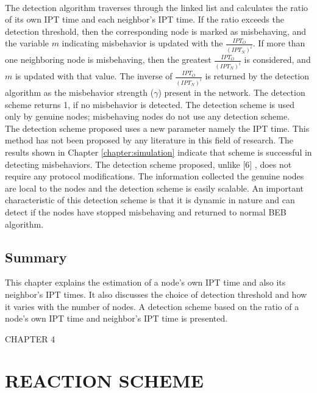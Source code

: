 \documentclass[12pt,letterpaper,english]{article}
\begin{document}
\\
\indent The detection algorithm traverses through the linked list and calculates the ratio of its own IPT time and each neighbor's IPT time. If the ratio exceeds the detection threshold, then the corresponding node is marked as misbehaving, and the variable $m$ indicating misbehavior is updated with the $\frac{IPT_O}{(IPT_N)^i}$. If more than one neighboring node is misbehaving, then the greatest $\frac{IPT_O}{(IPT_N)^i}$ is considered, and $m$ is updated with that value. The inverse of $\frac{IPT_O}{(IPT_N)^i}$ is returned by the detection algorithm as the misbehavior strength ($\gamma$) present in the network.
The detection scheme returns 1, if no misbehavior is detected.
The detection scheme is used only by genuine nodes; misbehaving nodes do not use any detection scheme.
\\
\indent The detection scheme proposed uses a new parameter namely the IPT time. This method has not been proposed by any  literature in this field of research. The results shown in Chapter \ref{chapter:simulation} indicate that scheme is successful in detecting misbehaviors. The detection scheme proposed, unlike 
[6]
, does not require any protocol modifications. The information collected the genuine nodes are local to the nodes and the detection scheme is easily scalable. An important characteristic of this detection scheme is that it is dynamic in nature and can detect if the nodes have stopped misbehaving and returned to normal BEB algorithm. 
\subsection{Summary}
\label{summarydetection}
\indent This chapter explains the estimation of a node's own IPT time and also its neighbor's IPT times. It also discusses the choice of detection threshold and how it varies with the number of nodes. A detection scheme based on the ratio of a node's own IPT time and neighbor's IPT time is presented.
\newpage
\setcounter{figure}{0}
\setcounter{table}{0}
\setcounter{subsection}{0}
\begin{singlespace}
\begin{center}
CHAPTER 4
\section*{REACTION SCHEME}
\addtocounter{section}{1}
\label{chapter:reaction}
\end{center}
\end{singlespace}
\end{document}
